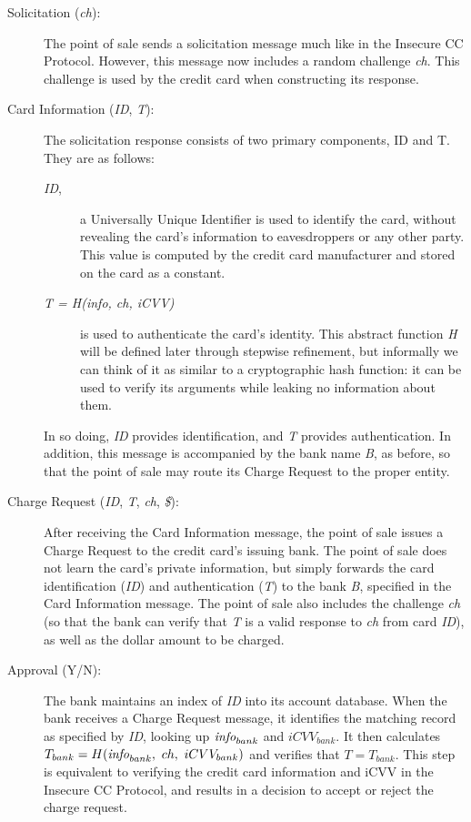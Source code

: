 \begin{description}
\item[Solicitation (\emph{ch}):]
The point of sale sends a solicitation message much like in the Insecure CC Protocol.
However, this message now includes a random challenge \emph{ch}.
This challenge is used by the credit card when constructing its response.

\item[Card Information (\emph{ID}, \emph{T}):]
The solicitation response consists of two primary components, ID and T. They are as follows:

\begin{description}
\item[\emph{ID},]a Universally Unique Identifier \cite{uuid} is used to identify the card, without revealing the card's information to eavesdroppers or any other party.
This value is computed by the credit card manufacturer and stored on the card as a constant.

\item[\emph{T = H(info, ch, iCVV)}] is used to authenticate the card's identity.
This abstract function \emph{H} will be defined later through stepwise refinement, but informally we can think of it as similar to a cryptographic hash function:
	it can be used to verify its arguments while leaking no information about them.
\end{description}

In so doing, \emph{ID} provides identification, and \emph{T} provides authentication.
In addition, this message is accompanied by the bank name \emph{B}, as before, so that the point of sale may route its Charge Request to the proper entity.

\item[Charge Request (\emph{ID}, \emph{T}, \emph{ch}, \emph{\$}):]
After receiving the Card Information message, the point of sale issues a Charge Request to the credit card's issuing bank.
The point of sale does not learn the card's private information, but simply forwards the card identification (\emph{ID}) and authentication (\emph{T}) to the bank \emph{B},
    specified in the Card Information message.
The point of sale also includes the challenge \emph{ch}
	(so that the bank can verify that \emph{T} is a valid response to \emph{ch} from card \emph{ID}),
	as well as the dollar amount to be charged.

\item[Approval (Y/N):]
The bank maintains an index of \emph{ID} into its account database.
When the bank receives a Charge Request message, it identifies the matching record as specified by \emph{ID}, looking up $\textrm{\emph{info}}_{bank}$ and $iCVV_{bank}$.
It then calculates $T_{bank} = H(\textrm{\emph{info}}_{bank},~ ch,~ iCVV_{bank})$ and verifies that $T = T_{bank}$.
This step is equivalent to verifying the credit card information and iCVV in the Insecure CC Protocol,
	and results in a decision to accept or reject the charge request.

\end{description}





